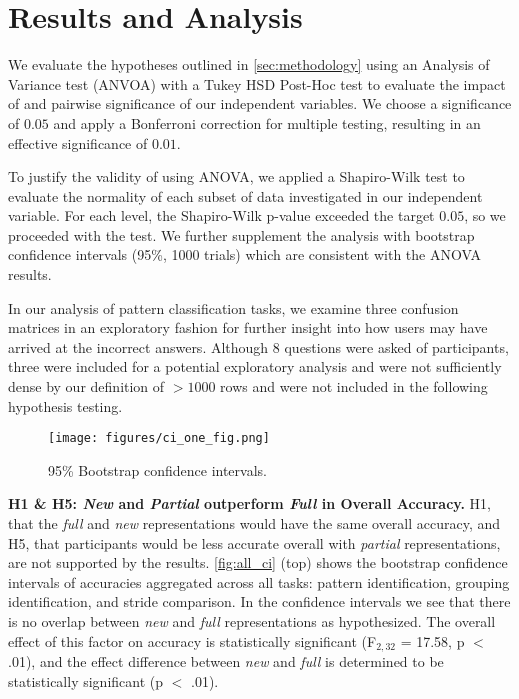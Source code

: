 \section{Results and Analysis}
\label{sec:analysis}
    We evaluate the hypotheses outlined in \autoref{sec:methodology} using an Analysis of Variance test (ANVOA) with a Tukey HSD Post-Hoc test to evaluate the impact of and pairwise significance of our independent variables. We choose a significance of $0.05$ and apply a Bonferroni correction for multiple testing, resulting in an effective significance of $0.01$. 
    
    To justify the validity of using ANOVA, we applied a Shapiro-Wilk test to evaluate the normality of each subset of data investigated in our independent variable. For each level, the Shapiro-Wilk p-value exceeded the target $0.05$, so we proceeded with the test. We further supplement the analysis with bootstrap confidence intervals (95\%, 1000 trials) which are consistent with the ANOVA results.
    
    In our analysis of pattern classification tasks, we examine three confusion matrices in an exploratory fashion for further insight into how users may have arrived at the incorrect answers. Although 8 questions were asked of participants, three were included for a potential exploratory analysis and were not sufficiently dense by our definition of $>1000$ rows and were not included in the following hypothesis testing.
            
    \begin{figure}
        \centering
        \texttt{[image: figures/ci\_one\_fig.png]}
        \caption{95\% Bootstrap confidence intervals. }
        \label{fig:all_ci}
    \end{figure}
    
    \vspace{1ex}
    
\textbf{H1 \& H5: {\em New} and {\em Partial} outperform {\em Full} in Overall Accuracy.} H1, that the {\em full} and {\em new} representations would have the same overall accuracy, and H5, that participants would be less accurate overall with {\em partial} representations, are not supported by the results. \autoref{fig:all_ci} (top) shows the bootstrap confidence intervals of accuracies aggregated across all tasks: pattern identification, grouping identification, and stride comparison. In the confidence intervals we see that there is no overlap between {\em new} and {\em full} representations as hypothesized. The overall effect of this factor on accuracy is statistically significant  (F$_{2,32}$ = 17.58, p $<$ .01), and the effect difference between {\em new} and {\em full} is determined to be statistically significant (p $<$ .01).

